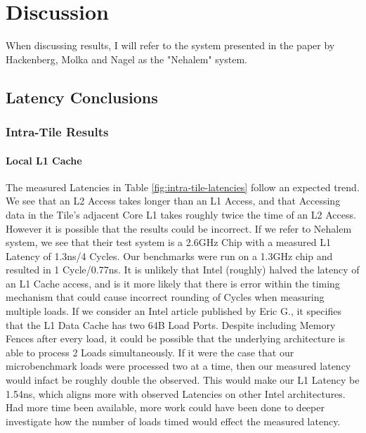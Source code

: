 \documentclass[bsc,frontabs,twoside,singlespacing,parskip,deptreport]{infthesis}     %
\begin{document}
\chapter{Discussion}\label{chap:discussion}
When discussing results, I will refer to the system presented in the paper by Hackenberg, Molka and Nagel\cite{cache-coherence-paper} as the "Nehalem" system.
\section{Latency Conclusions}
\subsection{Intra-Tile Results}
\subsubsection{Local L1 Cache}
The measured Latencies in Table \ref{fig:intra-tile-latencies} follow an expected trend. We see that an L2 Access takes longer than an L1 Access, and that Accessing data in the Tile's adjacent Core L1 takes roughly twice the time of an L2 Access. However it is possible that the results could be incorrect. If we refer to Nehalem system, we see that their test system is a 2.6GHz Chip with a measured L1 Latency of 1.3ns/4 Cycles. Our benchmarks were run on a 1.3GHz chip and resulted in 1 Cycle/0.77ns. It is unlikely that Intel (roughly) halved the latency of an L1 Cache access, and is it more likely that there is error within the timing mechanism that could cause incorrect rounding of Cycles when measuring multiple loads. If we consider an Intel article published by Eric G.\cite{eric-intel-article}, it specifies that the L1 Data Cache has two 64B Load Ports. Despite including Memory Fences after every load, it could be possible that the underlying architecture is able to process 2 Loads simultaneously. If it were the case that our microbenchmark loads were processed two at a time, then our measured latency would infact be roughly double the observed. This would make our L1 Latency be 1.54ns, which aligns more with observed Latencies on other Intel architectures. Had more time been available, more work could have been done to deeper investigate how the number of loads timed would effect the measured latency.
\end{document}
